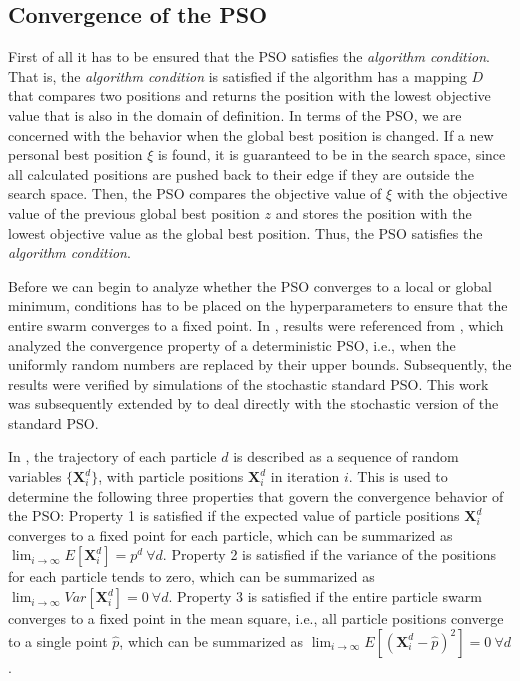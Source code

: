 \documentclass[
  oneside, a4paper, 12pt, openany]{book}
\theoremstyle{definition}
\theoremstyle{definition}
\theoremstyle{definition}
\theoremstyle{definition}
\theoremstyle{remark}
\begin{document}
\hypertarget{convergence-of-the-pso}{%
\subsection{Convergence of the PSO}\label{convergence-of-the-pso}}

First of all it has to be ensured that the PSO satisfies the \emph{algorithm condition}. That is, the \emph{algorithm condition} is satisfied if the algorithm has a mapping \(D\) that compares two positions and returns the position with the lowest objective value that is also in the domain of definition. In terms of the PSO, we are concerned with the behavior when the global best position is changed. If a new personal best position \(\xi\) is found, it is guaranteed to be in the search space, since all calculated positions are pushed back to their edge if they are outside the search space. Then, the PSO compares the objective value of \(\xi\) with the objective value of the previous global best position \(z\) and stores the position with the lowest objective value as the global best position. Thus, the PSO satisfies the \emph{algorithm condition}.

Before we can begin to analyze whether the PSO converges to a local or global minimum, conditions has to be placed on the hyperparameters to ensure that the entire swarm converges to a fixed point. In \citep{FbEn2010}, results were referenced from \citep{RiPo2007}, which analyzed the convergence property of a deterministic PSO, i.e., when the uniformly random numbers are replaced by their upper bounds. Subsequently, the results were verified by simulations of the stochastic standard PSO. This work was subsequently extended by \citep{Mjly2006} to deal directly with the stochastic version of the standard PSO.

In \citep{Mjly2006}, the trajectory of each particle \(d\) is described as a sequence of random variables \(\{\pmb{X}^d_i\}\), with particle positions \(\pmb{X}^d_i\) in iteration \(i\). This is used to determine the following three properties that govern the convergence behavior of the PSO: Property 1 is satisfied if the expected value of particle positions \(\pmb{X}^d_i\) converges to a fixed point for each particle, which can be summarized as \(\lim_{i\rightarrow \infty} E[\pmb{X}^d_i] = p^d \ \forall d\). Property 2 is satisfied if the variance of the positions for each particle tends to zero, which can be summarized as \(\lim_{i\rightarrow \infty} Var[\pmb{X}^d_i] = 0 \ \forall d\). Property 3 is satisfied if the entire particle swarm converges to a fixed point in the mean square, i.e., all particle positions converge to a single point \(\hat{p}\), which can be summarized as \(\lim_{i\rightarrow \infty} E[(\pmb{X}_i^d-\hat{p})^2]=0 \ \forall d\).
\end{document}
